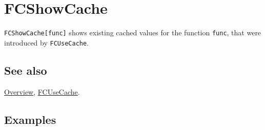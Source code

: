 \documentclass[../FeynCalcManual.tex]{subfiles}
\begin{document}
\hypertarget{fcshowcache}{%
\section{FCShowCache}\label{fcshowcache}}

\texttt{FCShowCache[\allowbreak{}func]} shows existing cached values for
the function \texttt{func}, that were introduced by \texttt{FCUseCache}.

\subsection{See also}

\hyperlink{toc}{Overview}, \hyperlink{fcusecache}{FCUseCache}.

\subsection{Examples}
\end{document}
